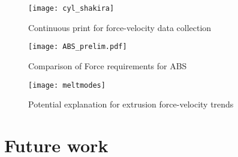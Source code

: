 \documentclass[main.tex]{subfiles}
\begin{document}
\begin{figure}[!htbp]
	\center
	\texttt{[image: cyl\_shakira]}
	\caption{Continuous print for force-velocity data collection} \label{fig:cyl}
\end{figure}

\begin{figure}[!htbp]
	\center
	\texttt{[image: ABS\_prelim.pdf]}
	\caption{Comparison of Force requirements for ABS} \label{fig:absprelim}
\end{figure}

\begin{figure}[!htbp]
	\center
	\texttt{[image: meltmodes]}
	\caption{Potential explanation for extrusion force-velocity trends} \label{fig:meltmodes}
\end{figure}



\section{Future work} \label{sec:fw}



% 

\end{document}
